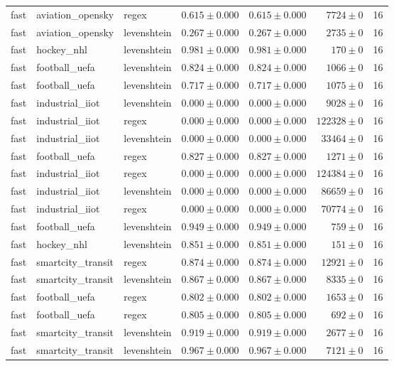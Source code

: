\begin{table}[htbp]
\begin{tabular}{l l l r r r r}
fast & aviation\_opensky & regex & $0.615\pm0.000$ & $0.615\pm0.000$ & $7724\pm0$ & 16 \\
fast & aviation\_opensky & levenshtein & $0.267\pm0.000$ & $0.267\pm0.000$ & $2735\pm0$ & 16 \\
fast & hockey\_nhl & levenshtein & $0.981\pm0.000$ & $0.981\pm0.000$ & $170\pm0$ & 16 \\
fast & football\_uefa & levenshtein & $0.824\pm0.000$ & $0.824\pm0.000$ & $1066\pm0$ & 16 \\
fast & football\_uefa & levenshtein & $0.717\pm0.000$ & $0.717\pm0.000$ & $1075\pm0$ & 16 \\
fast & industrial\_iiot & levenshtein & $0.000\pm0.000$ & $0.000\pm0.000$ & $9028\pm0$ & 16 \\
fast & industrial\_iiot & regex & $0.000\pm0.000$ & $0.000\pm0.000$ & $122328\pm0$ & 16 \\
fast & industrial\_iiot & levenshtein & $0.000\pm0.000$ & $0.000\pm0.000$ & $33464\pm0$ & 16 \\
fast & football\_uefa & regex & $0.827\pm0.000$ & $0.827\pm0.000$ & $1271\pm0$ & 16 \\
fast & industrial\_iiot & regex & $0.000\pm0.000$ & $0.000\pm0.000$ & $124384\pm0$ & 16 \\
fast & industrial\_iiot & levenshtein & $0.000\pm0.000$ & $0.000\pm0.000$ & $86659\pm0$ & 16 \\
fast & industrial\_iiot & regex & $0.000\pm0.000$ & $0.000\pm0.000$ & $70774\pm0$ & 16 \\
fast & football\_uefa & levenshtein & $0.949\pm0.000$ & $0.949\pm0.000$ & $759\pm0$ & 16 \\
fast & hockey\_nhl & levenshtein & $0.851\pm0.000$ & $0.851\pm0.000$ & $151\pm0$ & 16 \\
fast & smartcity\_transit & regex & $0.874\pm0.000$ & $0.874\pm0.000$ & $12921\pm0$ & 16 \\
fast & smartcity\_transit & levenshtein & $0.867\pm0.000$ & $0.867\pm0.000$ & $8335\pm0$ & 16 \\
fast & football\_uefa & regex & $0.802\pm0.000$ & $0.802\pm0.000$ & $1653\pm0$ & 16 \\
fast & football\_uefa & regex & $0.805\pm0.000$ & $0.805\pm0.000$ & $692\pm0$ & 16 \\
fast & smartcity\_transit & levenshtein & $0.919\pm0.000$ & $0.919\pm0.000$ & $2677\pm0$ & 16 \\
fast & smartcity\_transit & levenshtein & $0.967\pm0.000$ & $0.967\pm0.000$ & $7121\pm0$ & 16 \\

\end{tabular}
\end{table}

